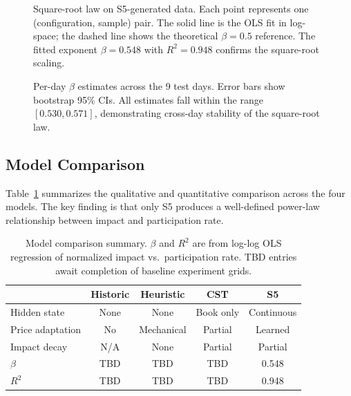 \documentclass[sigplan,screen,anonymous]{acmart}
\begin{document}
\begin{figure}[t]
  \centering
  \caption{Square-root law on S5-generated data. Each point represents one (configuration, sample) pair. The solid line is the OLS fit in log-space; the dashed line shows the theoretical $\beta = 0.5$ reference. The fitted exponent $\beta = 0.548$ with $R^2 = 0.948$ confirms the square-root scaling.}
  \label{fig:loglog}
\end{figure}

\begin{figure}[t]
  \centering
  \caption{Per-day $\beta$ estimates across the 9 test days. Error bars show bootstrap 95\% CIs. All estimates fall within the range $[0.530, 0.571]$, demonstrating cross-day stability of the square-root law.}
  \label{fig:perday}
\end{figure}


\subsection{Model Comparison}
\label{sec:comparison}

Table~\ref{tab:comparison} summarizes the qualitative and quantitative comparison across the four models. The key finding is that only S5 produces a well-defined power-law relationship between impact and participation rate.

\begin{table}[t]
  \caption{Model comparison summary. $\beta$ and $R^2$ are from log-log OLS regression of normalized impact vs.\ participation rate. TBD entries await completion of baseline experiment grids.}
  \label{tab:comparison}
  \centering
  \small
  \begin{tabular}{@{}lcccc@{}}
    \toprule
    & \textbf{Historic} & \textbf{Heuristic} & \textbf{CST} & \textbf{S5} \\
    \midrule
    Hidden state       & None & None & Book only & Continuous \\
    Price adaptation   & No   & Mechanical & Partial & Learned \\
    Impact decay       & N/A  & None & Partial & Partial \\
    $\beta$            & TBD  & TBD  & TBD & 0.548 \\
    $R^2$              & TBD  & TBD  & TBD & 0.948 \\
    \bottomrule
  \end{tabular}
\end{table}
\end{document}
